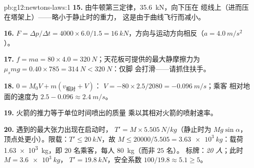 \begin{solution}{pb:g12:newtons-laws:1}
\textbf{15.} 由牛顿第三定律，\qty{35.6}{kN}，向下压在
缆线上（进而压在塔架上）——略小于静止时的重力，
这是由于曲线飞行而减小。

\textbf{16.} $F = \Delta p/\Delta t = 4000 \times 6.0/1.5 =
\qty{16}{kN}$，方向与运动方向相反（$a = \qty{4.0}{m/s^2}$）。

\textbf{17.} $f = ma = 80 \times 4.0 = \qty{320}{N}$；天花板可提供的最大静摩擦力为
$\mu_s mg = 0.40 \times 785 = \qty{314}{N} < \qty{320}{N}$：仅脚
会打滑——请抓住扶手。

\textbf{18.} $0 = M_0 V + m(v_{\text{相对}} + V)$：
$V = -80 \times 2.5/2080 = \qty{-0.096}{m/s}$；乘客
相对地面的速度为 $2.5 - 0.096 \approx \qty{2.4}{m/s}$。

\textbf{19.} 火箭的推力等于单位时间喷出的质量
乘以其相对火箭的喷射速率。

\textbf{20.} 遇到的最大张力出现在启动时，
$T' = M \times \qty{5.505}{N/kg}$（静止时为 $Mg\sin\alpha$，
顶点处更小）。限载：$T' \leq \qty{20}{kN}$，故
$M \leq 20000/5.505 = \qty{3.63e3}{kg}$：载荷
\qty{1.63e3}{kg}，即 $20$ 名乘客，每人 \qty{80}{kg}（而非 $25$ 名）。
标牌：\emph{20 人}；此时 $M = \qty{3.6e3}{kg}$，
$T' = \qty{19.8}{kN}$，安全系数 $100/19.8 \approx 5.1 \geq 5$。
\end{solution}
